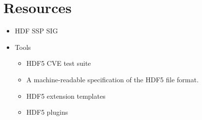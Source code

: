 \documentclass[../main.tex]{subfiles}
\begin{document}
\section{Resources}
\label{sec:resources}

\begin{itemize}
    \item HDF SSP SIG~\cite{hdf5-ssp-sig}
    \item Tools
    \begin{itemize}
        \item HDF5 CVE test suite~\cite{cve_hdf5}
        \item A machine-readable specification of the HDF5 file format.~\cite{hdf5-pickles}
        \item HDF5 extension templates~\cite{hdf5-boneyard}
        \item HDF5 plugins~\cite{hdf5_plugins}
    \end{itemize}
\end{itemize}
\end{document}
